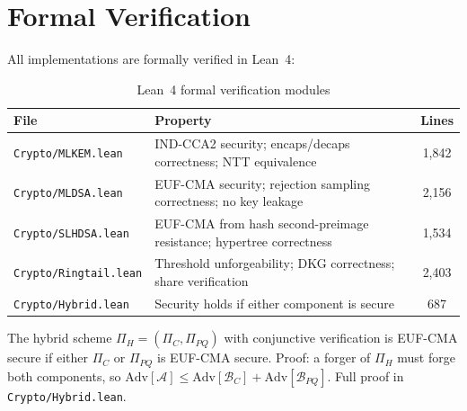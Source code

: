 \section{Formal Verification}


All implementations are formally verified in Lean~4:

\begin{table}[h]
\centering
\begin{tabular}{lp{6.5cm}c}
\toprule
\textbf{File} & \textbf{Property} & \textbf{Lines} \\
\midrule
\texttt{Crypto/MLKEM.lean} & IND-CCA2 security; encaps/decaps correctness; NTT equivalence & 1,842 \\
\texttt{Crypto/MLDSA.lean} & EUF-CMA security; rejection sampling correctness; no key leakage & 2,156 \\
\texttt{Crypto/SLHDSA.lean} & EUF-CMA from hash second-preimage resistance; hypertree correctness & 1,534 \\
\texttt{Crypto/Ringtail.lean} & Threshold unforgeability; DKG correctness; share verification & 2,403 \\
\texttt{Crypto/Hybrid.lean} & Security holds if either component is secure & 687 \\
\bottomrule
\end{tabular}
\caption{Lean~4 formal verification modules}
\label{tab:lean-crypto}
\end{table}

\begin{theorem}
The hybrid scheme $\Pi_H = (\Pi_C, \Pi_{PQ})$ with conjunctive verification is EUF-CMA secure if either $\Pi_C$ or $\Pi_{PQ}$ is EUF-CMA secure. Proof: a forger of $\Pi_H$ must forge both components, so $\text{Adv}[\mathcal{A}] \leq \text{Adv}[\mathcal{B}_C] + \text{Adv}[\mathcal{B}_{PQ}]$. Full proof in \texttt{Crypto/Hybrid.lean}.
\end{theorem}

